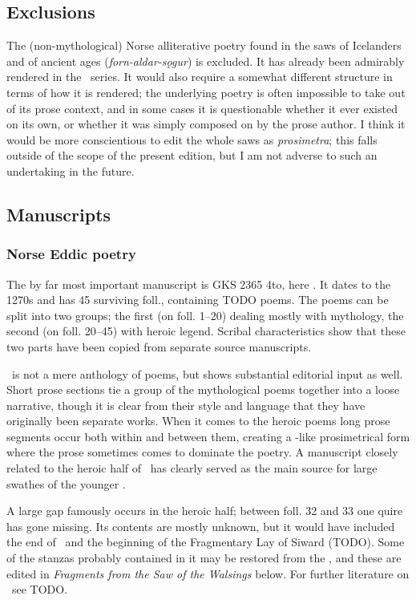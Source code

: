   \subsection{Exclusions}
    The (non-mythological) Norse alliterative poetry found in the saws of Icelanders and of ancient ages (\emph{forn-aldar-sǫgur}) is excluded.  It has already been admirably rendered in the \Skp\ series.  It would also require a somewhat different structure in terms of how it is rendered; the underlying poetry is often impossible to take out of its prose context, and in some cases it is questionable whether it ever existed on its own, or whether it was simply composed on by the prose author.  I think it would be more conscientious to edit the whole saws as \emph{prosimetra}; this falls outside of the scope of the present edition, but I am not adverse to such an undertaking in the future.

  \subsection{Manuscripts}

    \subsubsection{Norse Eddic poetry}

    The by far most important manuscript is GKS 2365 4to, here \Regius. It dates to the 1270s and has 45 surviving foll., containing TODO poems.  The poems can be split into two groups; the first (on foll. 1–20) dealing mostly with mythology, the second (on foll. 20–45) with heroic legend.  Scribal characteristics show that these two parts have been copied from separate source manuscripts.

    \Regius\ is not a mere anthology of poems, but shows substantial editorial input as well.  Short prose sections tie a group of the mythological poems together into a loose narrative, though it is clear from their style and language that they have originally been separate works.  When it comes to the heroic poems long prose segments occur both within and between them, creating a -like prosimetrical form where the prose sometimes comes to dominate the poetry.  A manuscript closely related to the heroic half of \Regius\ has clearly served as the main source for large swathes of the younger \VolsungaSaga.

    A large gap famously occurs in the heroic half; between foll. 32 and 33 one quire has gone missing.  Its contents are mostly unknown, but it would have included the end of \Sigrdrifumal\ and the beginning of the Fragmentary Lay of Siward (TODO).  Some of the stanzas probably contained in it may be restored from the \VolsungaSaga, and these are edited in \emph{Fragments from the Saw of the Walsings} below.  For further literature on \Regius\ see TODO.


